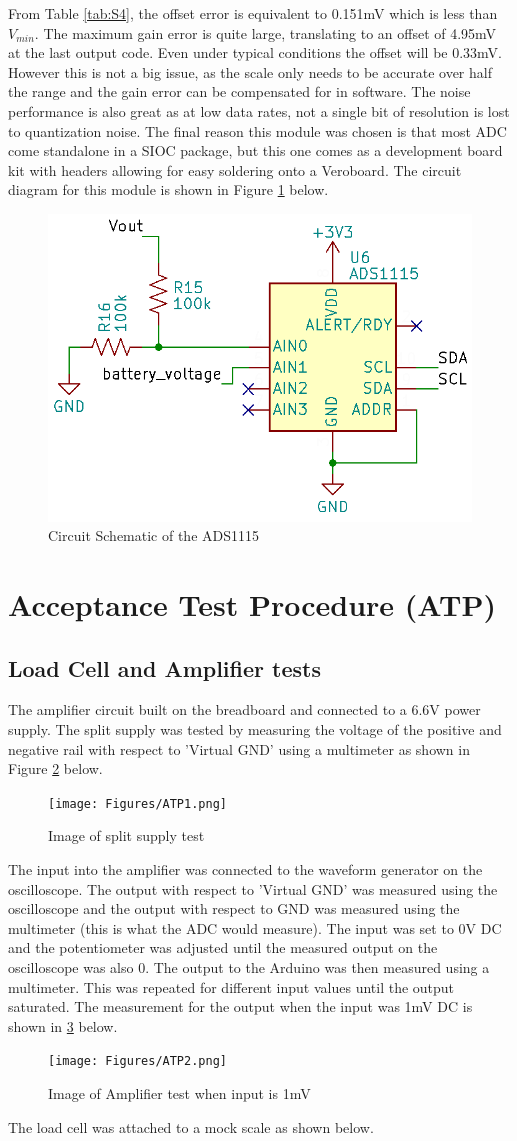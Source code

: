 \documentclass[class=report,11pt,crop=false]{standalone}
\begin{document}
	From Table \ref{tab:S4}, the offset error is equivalent to 0.151mV which is less than $V_{min}$. The maximum gain error is quite large, translating to an offset of 4.95mV at the last output code. Even under typical conditions the offset will be 0.33mV. However this is not a big issue, as the scale only needs to be accurate over half the range and the gain error can be compensated for in software. The noise performance is also great as at low data rates, not a single bit of resolution is lost to quantization noise. The final reason this module was chosen is that most ADC come standalone in a SIOC package, but this one comes as a development board kit with headers allowing for easy soldering onto a Veroboard. The circuit diagram for this module is shown in Figure \ref{fig:S6} below.
	\begin{figure}[h!]
		\centering
		\includegraphics[width=0.5\linewidth]{Figures/ADC.png}
		\caption{Circuit Schematic of the ADS1115}
		\label{fig:S6}
	\end{figure}
	
	\section{Acceptance Test Procedure (ATP)}
	\subsection{Load Cell and Amplifier tests}
	The amplifier circuit built on the breadboard and connected to a 6.6V power supply. The split supply was tested by measuring the voltage of the positive and negative rail with respect to 'Virtual GND' using a multimeter as shown in Figure \ref{fig:S7} below.
	\begin{figure}[h!]
		\centering
		\texttt{[image: Figures/ATP1.png]}
		\caption{Image of split supply test}
		\label{fig:S7}
	\end{figure}
	The input into the amplifier was connected to the waveform generator on the oscilloscope. The output with respect to 'Virtual GND' was measured using the oscilloscope and the output with respect to GND was measured using the multimeter (this is what the ADC would measure). The input was set to 0V DC and the potentiometer was adjusted until the measured output on the oscilloscope was also 0. The output to the Arduino was then measured using a multimeter. This was repeated for different input values until the output saturated. The measurement for the output when the input was 1mV DC is shown in \ref{fig:S8} below.
	\begin{figure}[h!]
		\centering
		\texttt{[image: Figures/ATP2.png]}
		\caption{Image of Amplifier test when input is 1mV}
		\label{fig:S8}
	\end{figure}
	
	The load cell was attached to a mock scale as shown below.
	\ifstandalone
	
	\printnoidxglossary[type=\acronymtype,nonumberlist]
	\fi
\end{document}
